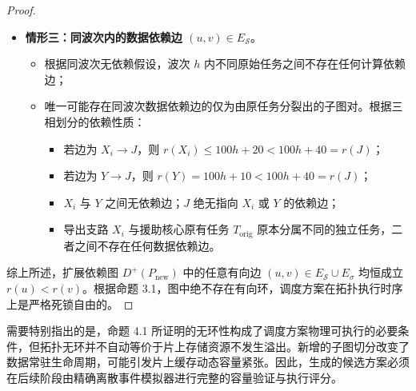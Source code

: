 \documentclass[anonymous,withtoc]{gmcm2026}
\providecommand{\tightlist}{\setlength{\itemsep}{0pt}\setlength{\parskip}{0pt}}
\begin{document}
\begin{proof}
\begin{itemize}
  \begin{itemize}
  \tightlist
  \item
    在援助核心上，调度序列为 \(X_1 \to X_2 \to \cdots \to X_m \to T_{\mathrm{orig}}\)。根据标号赋值，显然有 \(r(X_1) < r(X_2) < \cdots < r(X_m) < r(T_{\mathrm{orig}}) = 100h + 30\)；
  \item
    在捐赠核心上，调度序列为 \(Y \to J\)。根据定义，\(r(Y) = 100h + 10 < r(J) = 100h + 40\)；
  \item
    其余核心在波次 \(h\) 内至多只有一个任务，不存在同波次调度边。
  \end{itemize}
\item
  \textbf{情形三：同波次内的数据依赖边 \((u, v) \in E_{\mathcal{S}}\)}。

  \begin{itemize}
  \tightlist
  \item
    根据同波次无依赖假设，波次 \(h\) 内不同原始任务之间不存在任何计算依赖边；
  \item
    唯一可能存在同波次数据依赖边的仅为由原任务分裂出的子图对。根据三相划分的依赖性质：

    \begin{itemize}
    \tightlist
    \item
      若边为 \(X_i \to J\)，则 \(r(X_i) \le 100h + 20 < 100h + 40 = r(J)\)；
    \item
      若边为 \(Y \to J\)，则 \(r(Y) = 100h + 10 < 100h + 40 = r(J)\)；
    \item
      \(X_i\) 与 \(Y\) 之间无依赖边；\(J\) 绝无指向 \(X_i\) 或 \(Y\) 的依赖边；
    \item
      导出支路 \(X_i\) 与援助核心原有任务 \(T_{\mathrm{orig}}\) 原本分属不同的独立任务，二者之间不存在任何数据依赖边。
    \end{itemize}
  \end{itemize}
\end{itemize}

综上所述，扩展依赖图 \(D^+(P_{\mathrm{new}})\) 中的任意有向边 \((u, v) \in E_{\mathcal{S}} \cup E_\sigma\) 均恒成立 \(r(u) < r(v)\)。根据命题 3.1，图中绝不存在有向环，调度方案在拓扑执行时序上是严格死锁自由的。 \end{proof}

需要特别指出的是，命题 4.1 所证明的无环性构成了调度方案物理可执行的必要条件，但拓扑无环并不自动等价于片上存储资源不发生溢出。新增的子图切分改变了数据常驻生命周期，可能引发片上缓存动态容量紧张。因此，生成的候选方案必须在后续阶段由精确离散事件模拟器进行完整的容量验证与执行评分。
\end{document}
